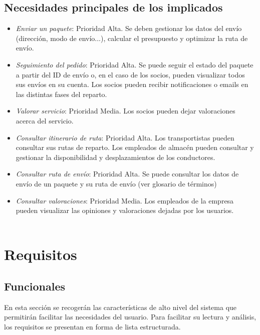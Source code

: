 	\subsection{Necesidades principales de los implicados}
	\begin{itemize}
		\item \textit{Enviar un paquete}: Prioridad Alta. Se deben gestionar los datos del envío (dirección, modo de envío...), calcular el presupuesto y optimizar la ruta de envío.
		\item \textit{Seguimiento del pedido}: Prioridad Alta. Se puede seguir el estado del paquete a partir del ID de envío o, en el caso de los socios, pueden visualizar todos sus envíos en su cuenta. Los socios pueden recibir notificaciones o emails en las distintas fases del reparto.
		\item \textit{Valorar servicio}: Prioridad Media. Los socios pueden dejar valoraciones acerca del servicio.
		\item \textit{Consultar itinerario de ruta}: Prioridad Alta. Los transportistas pueden consultar sus rutas de reparto. Los empleados de almacén pueden consultar y gestionar la disponibilidad  y desplazamientos de los conductores.
		\item \textit{Consultar ruta de envío}: Prioridad Alta. Se puede consultar los datos de envío de un paquete y su ruta de envío (ver glosario de términos)
		\item \textit{Consultar valoraciones}: Prioridad Media. Los empleados de la empresa pueden visualizar las opiniones y valoraciones dejadas por los usuarios.\\ \\
	\end{itemize}

\newpage

\section{Requisitos}
\subsection{Funcionales}
En esta sección se recogerán las características de alto nivel del sistema que permitirán facilitar las necesidades del usuario. Para facilitar su lectura y análisis, los requisitos se presentan en forma de lista estructurada. 

